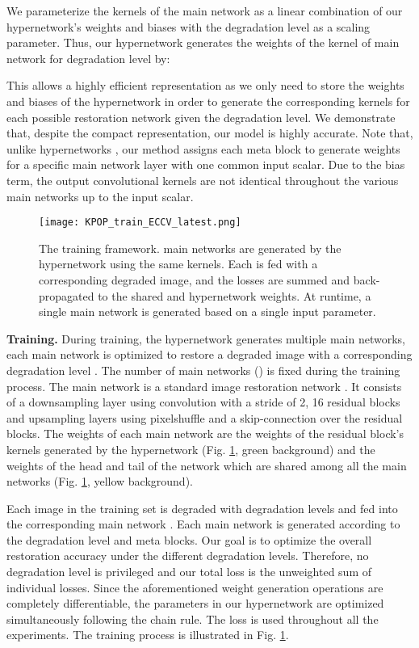 \documentclass{article}
\begin{document}
We parameterize the kernels of the main network as a linear combination of our hypernetwork's weights and biases with the degradation level as a scaling parameter. Thus, our hypernetwork  generates the weights of the  kernel of main network  for degradation level  by: 


This allows a highly efficient representation as we only need to store the weights and biases of the hypernetwork in order to generate the corresponding kernels for each possible restoration network given the degradation level. We demonstrate that, despite the compact representation, our model is highly accurate. Note that, unlike hypernetworks \cite{ha2016hypernetworks}, our method assigns each meta block to generate weights for a specific main network layer with one common input scalar. Due to the bias term, the output convolutional kernels are not identical throughout the various main networks up to the input scalar.


\begin{figure}[tb]
    \begin{center}
        \texttt{[image: KPOP\_train\_ECCV\_latest.png]}
    \end{center}
   \caption{The training framework.  main networks are generated by the hypernetwork using the same kernels. Each is fed with a corresponding degraded image, and the losses are summed and back-propagated to the shared and hypernetwork weights. At runtime, a single main network is generated based on a single input parameter.}
\label{fig:train}
\end{figure}

{\bf Training.} During training, the hypernetwork generates multiple main networks, each main network  is optimized to restore a degraded image with a corresponding degradation level . The number of main networks () is fixed during the training process. The main network is a standard image restoration network \cite{arcnn}. It consists of a downsampling layer using convolution with a stride of 2, 16 residual \cite{he2016deep} blocks and upsampling layers using pixelshuffle \cite{shi2016real} and a skip-connection over the residual blocks. The weights of each main network are the weights of the residual block's kernels generated by the hypernetwork (Fig. \ref{fig:train}, green background) and the weights of the head and tail of the network which are shared among all the main networks (Fig. \ref{fig:train}, yellow background). 

Each image in the training set  is degraded with  degradation levels  and fed into the corresponding main network . Each main network is generated according to the degradation level  and meta blocks. Our goal is to optimize the overall restoration accuracy under the different degradation levels. Therefore, no degradation level is privileged and our total loss is the unweighted sum of individual  losses. Since the aforementioned weight generation operations are completely differentiable, the parameters in our hypernetwork  are optimized simultaneously following the chain rule. The  loss is used throughout all the experiments. The training process is illustrated in Fig. \ref{fig:train}. 
\end{document}
